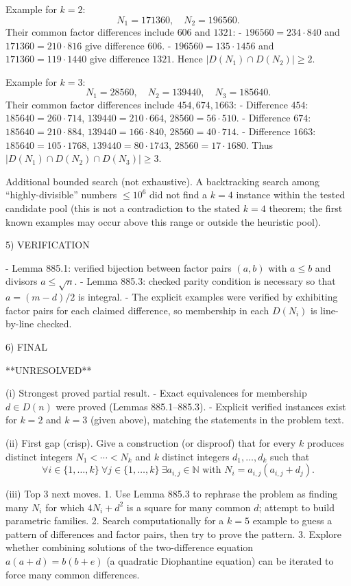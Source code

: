 Example for $k=2$:
\[N_1=171360,\quad N_2=196560.
\]
Their common factor differences include $606$ and $1321$:
- $196560=234\cdot 840$ and $171360=210\cdot 816$ give difference $606$.
- $196560=135\cdot 1456$ and $171360=119\cdot 1440$ give difference $1321$.
Hence $|D(N_1)\cap D(N_2)|\ge 2$.

Example for $k=3$:
\[N_1=28560,\quad N_2=139440,\quad N_3=185640.
\]
Their common factor differences include $454,674,1663$:
- Difference $454$:
  $185640=260\cdot 714$, $139440=210\cdot 664$, $28560=56\cdot 510$.
- Difference $674$:
  $185640=210\cdot 884$, $139440=166\cdot 840$, $28560=40\cdot 714$.
- Difference $1663$:
  $185640=105\cdot 1768$, $139440=80\cdot 1743$, $28560=17\cdot 1680$.
Thus $|D(N_1)\cap D(N_2)\cap D(N_3)|\ge 3$.

Additional bounded search (not exhaustive).
A backtracking search among “highly-divisible” numbers $\le 10^6$ did not find a $k=4$ instance within the tested candidate pool (this is not a contradiction to the stated $k=4$ theorem; the first known examples may occur above this range or outside the heuristic pool).

5) VERIFICATION

- Lemma 885.1: verified bijection between factor pairs $(a,b)$ with $a\le b$ and divisors $a\le \sqrt n$.
- Lemma 885.3: checked parity condition is necessary so that $a=(m-d)/2$ is integral.
- The explicit examples were verified by exhibiting factor pairs for each claimed difference, so membership in each $D(N_i)$ is line-by-line checked.

6) FINAL

**UNRESOLVED**

(i) Strongest proved partial result.
- Exact equivalences for membership $d\in D(n)$ were proved (Lemmas 885.1--885.3).
- Explicit verified instances exist for $k=2$ and $k=3$ (given above), matching the statements in the problem text.

(ii) First gap (crisp).
Give a construction (or disproof) that for every $k$ produces distinct integers $N_1<\cdots<N_k$ and $k$ distinct integers $d_1,\dots,d_k$ such that
\[\forall i\in\{1,\dots,k\}\ \forall j\in\{1,\dots,k\}\ \exists a_{i,j}\in\mathbb N\text{ with }N_i=a_{i,j}(a_{i,j}+d_j).\]

(iii) Top 3 next moves.
1. Use Lemma 885.3 to rephrase the problem as finding many $N_i$ for which $4N_i+d^2$ is a square for many common $d$; attempt to build parametric families.
2. Search computationally for a $k=5$ example to guess a pattern of differences and factor pairs, then try to prove the pattern.
3. Explore whether combining solutions of the two-difference equation $a(a+d)=b(b+e)$ (a quadratic Diophantine equation) can be iterated to force many common differences.

